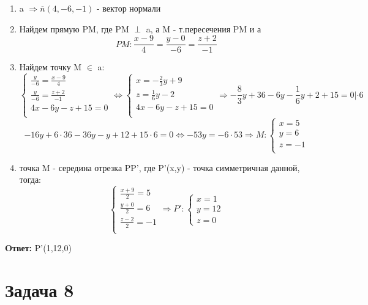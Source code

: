 \documentclass{article}
\begin{document}
\begin{enumerate}
  \item a $\Rightarrow \overline{n}(4,-6,-1) $ - вектор нормали 
  \item Найдем прямую PM, где PM $\perp$ a, а M - т.пересечения PM и а
  \[
    PM: \frac{x-9}{4} = \frac{y-0}{-6 } = \frac{z+2}{-1}
  \] 
\item Найдем точку M $\in$ a: 
  \[
    \begin{cases}
      \frac{y}{-6} = \frac{x-9}{4}\\ 
      \frac{y}{-6} = \frac{z+2}{-1}\\ 
     4x - 6y - z + 15 = 0\\ 
    \end{cases}
    \Leftrightarrow 
    \begin{cases}
      x = -\frac{2}{3}y + 9\\ 
      z = \frac{1}{6}y - 2 \\ 
      4x - 6y - z + 15 = 0\\ 
    \end{cases}
    \Rightarrow -\frac{8}{3}y + 36 - 6y - \frac{1}{6}y + 2 + 15 = 0| \cdot 6
  \]
  \[
    -16y + 6\cdot 36 -36y - y + 12 + 15\cdot 6 = 0 \Leftrightarrow -53y = -6\cdot 53 \Rightarrow M:
    \begin{cases}
      x = 5\\ 
      y = 6\\ 
      z = -1\\
    \end{cases}
  \]
\item точка M - середина отрезка PP', где P'(x,y) - точка симметричная данной, тогда:
\[
  \begin{cases}
    \frac{x+9}{2} = 5\\ 
    \frac{y+0}{2} = 6\\ 
    \frac{z-2}{2} = -1\\
  \end{cases}
  \Rightarrow P': 
  \begin{cases}
    x = 1\\ 
    y = 12\\ 
    z = 0
  \end{cases}
\]
\end{enumerate}

\textbf{Oтвет: }P'(1,12,0)

\section*{Задача 8}
\end{document}
